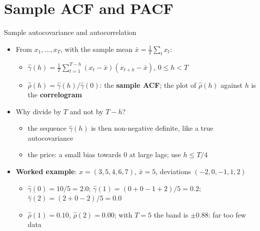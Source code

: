 \section{Sample ACF and PACF}

\begin{frame}{Sample autocovariance and autocorrelation}
\itemsize{\small}
\begin{itemize}
    \item From $x_1, \dots, x_T$, with the sample mean $\bar x = \frac1T\sum_t x_t$:
    \begin{itemize}
        \item $\hat\gamma(h) = \frac1T\sum_{t=1}^{T-h}(x_t - \bar x)(x_{t+h} - \bar x)$, $0 \le h < T$
        \item $\hat\rho(h) = \hat\gamma(h)/\hat\gamma(0)$: the \textbf{sample ACF}; the plot of $\hat\rho(h)$ against $h$ is the \textbf{correlogram}
    \end{itemize}
    \item Why divide by $T$ and not by $T - h$?
    \begin{itemize}
        \item the sequence $\hat\gamma(h)$ is then non-negative definite, like a true autocovariance 
        \item the price: a small bias towards 0 at large lags; use $h \le T/4$
    \end{itemize}
    \item \textbf{Worked example}: $x = (3, 5, 4, 6, 7)$, $\bar x = 5$, deviations $(-2, 0, -1, 1, 2)$
    \begin{itemize}
        \item $\hat\gamma(0) = 10/5 = 2.0$; $\hat\gamma(1) = (0 + 0 - 1 + 2)/5 = 0.2$; $\hat\gamma(2) = (2 + 0 - 2)/5 = 0.0$
        \item $\hat\rho(1) = 0.10$, $\hat\rho(2) = 0.00$; with $T = 5$ the band is $\pm 0.88$: far too few data
    \end{itemize}
\end{itemize}
\end{frame}

